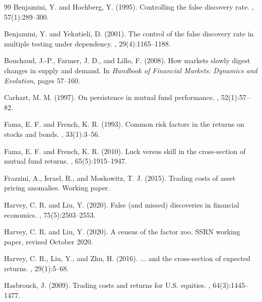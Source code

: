 \documentclass[12pt,a4paper]{article}
\begin{document}
\begin{thebibliography}{99}
Benjamini, Y. and Hochberg, Y. (1995).
\newblock Controlling the false discovery rate.
, 57(1):289--300.

Benjamini, Y. and Yekutieli, D. (2001).
\newblock The control of the false discovery rate in multiple testing under dependency.
, 29(4):1165--1188.

Bouchaud, J.-P., Farmer, J. D., and Lillo, F. (2008).
\newblock How markets slowly digest changes in supply and demand.
\newblock In {\em Handbook of Financial Markets: Dynamics and Evolution}, pages 57--160.

Carhart, M. M. (1997).
\newblock On persistence in mutual fund performance.
, 52(1):57--82.

Fama, E. F. and French, K. R. (1993).
\newblock Common risk factors in the returns on stocks and bonds.
, 33(1):3--56.

Fama, E. F. and French, K. R. (2010).
\newblock Luck versus skill in the cross-section of mutual fund returns.
, 65(5):1915--1947.

Frazzini, A., Israel, R., and Moskowitz, T. J. (2015).
\newblock Trading costs of asset pricing anomalies.
\newblock Working paper.

Harvey, C. R. and Liu, Y. (2020).
\newblock False (and missed) discoveries in financial economics.
, 75(5):2503--2553.

Harvey, C. R. and Liu, Y. (2020).
\newblock A census of the factor zoo.
\newblock SSRN working paper, revised October 2020.

Harvey, C. R., Liu, Y., and Zhu, H. (2016).
\newblock ... and the cross-section of expected returns.
, 29(1):5--68.

Hasbrouck, J. (2009).
\newblock Trading costs and returns for U.S. equities.
, 64(3):1445--1477.


\end{thebibliography}
\end{document}
